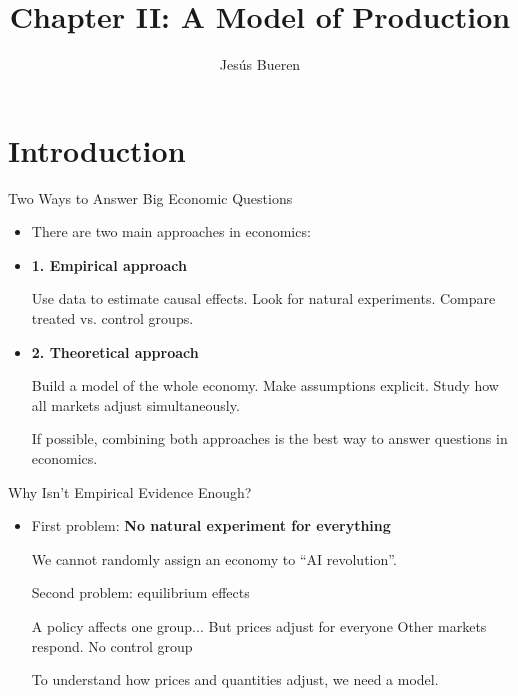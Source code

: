 \documentclass[10pt,aspectratio=169]{beamer}
\title{Chapter II: A Model of Production}
\author[Bueren]{Jes\'{u}s Bueren}
\institute[Cat\'{o}lica-Lisbon ] %
{

Cat\'{o}lica-Lisbon   

}
\date{}
\begin{document}
\begin{frame}[plain]
    \titlepage
\end{frame}
\section{Introduction}


\begin{frame}{Two Ways to Answer Big Economic Questions}

\begin{itemize}

    \item There are two main approaches in economics:

    \vspace{0.2cm}

    \item \textbf{1. Empirical approach}
    \begin{itemize}
        \itemvso Use data to estimate causal effects.
        \itemvso Look for natural experiments.
        \itemvso Compare treated vs. control groups.
    \end{itemize}

    \vspace{0.3cm}

    \item \textbf{2. Theoretical approach}
    \begin{itemize}
        \itemvso Build a model of the whole economy.
        \itemvso Make assumptions explicit.
        \itemvso Study how all markets adjust simultaneously.
    \end{itemize}
    \itemvso If possible, combining both approaches is the best way to answer questions in economics.
\end{itemize}

\end{frame}

\begin{frame}{Why Isn't Empirical Evidence Enough?}

\begin{itemize}

    \item First problem: \textbf{No natural experiment for everything}

    \begin{itemize}
        \itemvso We cannot randomly assign an economy to “AI revolution”.
    \end{itemize}

    \itemvso Second problem: equilibrium effects

    \begin{itemize}
        \itemvso A policy affects one group...
        \itemvso But prices adjust for everyone
        \itemvso Other markets respond.
        \itemvso No control group
    \end{itemize}

\itemvso To understand how prices and quantities adjust, we need a model.
\end{itemize}

\end{frame}
\end{document}
